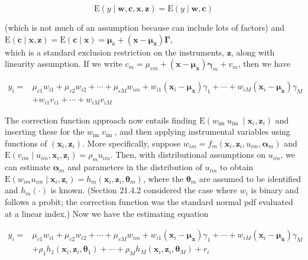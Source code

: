 \documentclass[10pt]{article}
\begin{document}
\begin{equation*}
\mathrm{E}(y \mid \mathbf{w}, \mathbf{c}, \mathbf{x}, \mathbf{z})=\mathrm{E}(y \mid \mathbf{w}, \mathbf{c}) \tag{21.129}
\end{equation*}


(which is not much of an assumption because can include lots of factors) and\\
$\mathrm{E}(\mathbf{c} \mid \mathbf{x}, \mathbf{z})=\mathrm{E}(\mathbf{c} \mid \mathbf{x})=\boldsymbol{\mu}_{\mathbf{c}}+\left(\mathbf{x}-\boldsymbol{\mu}_{\mathbf{x}}\right) \boldsymbol{\Gamma}$,\\
which is a standard exclusion restriction on the instruments, $\mathbf{z}$, along with linearity assumption. If we write $c_{m}=\mu_{c m}+\left(\mathbf{x}-\boldsymbol{\mu}_{\mathbf{x}}\right) \boldsymbol{\gamma}_{m}+v_{m}$, then we have

$$
\begin{aligned}
y_{i}= & \mu_{c 1} w_{i 1}+\mu_{c 2} w_{i 2}+\cdots+\mu_{c M} w_{i m}+w_{i 1}\left(\mathbf{x}_{i}-\boldsymbol{\mu}_{\mathbf{x}}\right) \gamma_{1}+\cdots+w_{i M}\left(\mathbf{x}_{i}-\boldsymbol{\mu}_{\mathbf{x}}\right) \gamma_{M} \\
& +w_{i 1} v_{i 1}+\cdots+w_{i M} v_{i M}
\end{aligned}
$$

The correction function approach now entails finding $\mathrm{E}\left(w_{\text {im }} u_{\text {im }} \mid \mathbf{x}_{i}, \mathbf{z}_{i}\right)$ and inserting these for the $w_{\text {im }} v_{\text {im }}$, and then applying instrumental variables using functions of $\left(\mathbf{x}_{i}, \mathbf{z}_{i}\right)$. More specifically, suppose $w_{i m}=f_{m}\left(\mathbf{x}_{i}, \mathbf{z}_{i}, u_{i m}, \boldsymbol{\alpha}_{m}\right)$ and $\mathrm{E}\left(v_{i m} \mid u_{i m}, \mathbf{x}_{i}, \mathbf{z}_{i}\right)= \rho_{m} u_{i m}$. Then, with distributional assumptions on $u_{i m}$, we can estimate $\boldsymbol{\alpha}_{m}$ and parameters in the distribution of $u_{i m}$ to obtain $\mathrm{E}\left(w_{i m} u_{i m} \mid \mathbf{x}_{i}, \mathbf{z}_{i}\right)=h_{m}\left(\mathbf{x}_{i}, \mathbf{z}_{i}, \boldsymbol{\theta}_{m}\right)$, where the $\boldsymbol{\theta}_{m}$ are assumed to be identified and $h_{m}(\cdot)$ is known. (Section 21.4.2 considered the case where $w_{i}$ is binary and follows a probit; the correction function was the standard normal pdf evaluated at a linear index.) Now we have the estimating equation


\begin{align*}
y_{i}= & \mu_{c 1} w_{i 1}+\mu_{c 2} w_{i 2}+\cdots+\mu_{c M} w_{i m}+w_{i 1}\left(\mathbf{x}_{i}-\boldsymbol{\mu}_{\mathbf{x}}\right) \gamma_{1}+\cdots+w_{i M}\left(\mathbf{x}_{i}-\boldsymbol{\mu}_{\mathbf{x}}\right) \gamma_{M} \\
& +\rho_{1} h_{1}\left(\mathbf{x}_{i}, \mathbf{z}_{i}, \boldsymbol{\theta}_{1}\right)+\cdots+\rho_{M} h_{M}\left(\mathbf{x}_{i}, \mathbf{z}_{i}, \boldsymbol{\theta}_{M}\right)+r_{i} \tag{21.131}
\end{align*}
\end{document}
